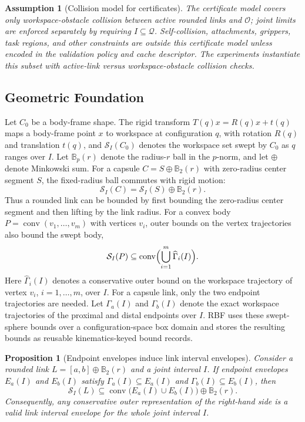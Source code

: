 \documentclass[journal]{IEEEtran}
\DeclareRobustCommand{\textsc}[1]{\textnormal{\MakeUppercase{#1}}}
\newtheorem{proposition}{Proposition}
\newtheorem{assumption}{Assumption}
\newcommand{\rbf}{\textsc{RBF}}
\newcommand{\Ball}{\ensuremath{\mathbb{B}}}
\newcommand{\Q}{\ensuremath{\mathcal{Q}}}
\begin{document}
\begin{samepage}
\begin{assumption}[Collision model for certificates]
\label{ass:collision_model}
The certificate model covers only workspace-obstacle collision between active
rounded links and $\mathcal{O}$; joint limits are enforced separately by
requiring $I\subseteq\Q$.
Self-collision, attachments, grippers, task regions, and other constraints are
outside this certificate model unless encoded in the validation policy and cache
descriptor. The experiments instantiate this subset with active-link
versus workspace-obstacle collision checks.
\end{assumption}
\end{samepage}

\subsection{Geometric Foundation}\label{sec:rewrite_geom}

Let \(C_0\) be a body-frame shape. The rigid transform
$T(q)x=R(q)x+t(q)$ maps a body-frame point \(x\) to workspace at configuration
$q$, with rotation $R(q)$ and translation $t(q)$, and
$\mathcal{S}_I(C_0)$ denotes the workspace set swept by \(C_0\) as $q$ ranges
over $I$. Let \(\Ball_p(r)\) denote the radius-\(r\) ball in the \(p\)-norm, and
let \(\oplus\) denote Minkowski sum. For a capsule $C=S\oplus \Ball_2(r)$ with
zero-radius center segment \(S\), the fixed-radius ball commutes with rigid
motion:
\[
\mathcal{S}_I(C)=\mathcal{S}_I(S)\oplus \Ball_2(r).
\]
Thus a rounded link can be bounded by first bounding the zero-radius center
segment and then lifting by the link radius. For a convex body
$P=\operatorname{conv}(v_1,\ldots,v_m)$ with vertices \(v_i\), outer bounds on
the vertex trajectories also bound the swept body,
\[
\mathcal{S}_I(P)\subseteq
\operatorname{conv}\Bigl(\bigcup_{i=1}^{m} \widehat{\Gamma}_i(I)\Bigr).
\]
Here \(\widehat{\Gamma}_i(I)\) denotes a conservative outer bound on the
workspace trajectory of vertex \(v_i\), \(i=1,\ldots,m\), over \(I\).
For a capsule link, only the two endpoint trajectories are needed. Let
\(\Gamma_a(I)\) and \(\Gamma_b(I)\) denote the exact workspace trajectories of
the proximal and distal endpoints over \(I\). \rbf{} uses these swept-sphere
bounds over a configuration-space box domain and stores the resulting bounds as
reusable kinematics-keyed bound records.

\begin{samepage}
\begin{proposition}[Endpoint envelopes induce link interval envelopes]
\label{prop:endpoint_to_link_envelope}
Consider a rounded link $L=[a,b]\oplus \Ball_2(r)$ and a joint interval $I$. If
endpoint envelopes $E_a(I)$ and $E_b(I)$ satisfy
$\Gamma_a(I)\subseteq E_a(I)$ and $\Gamma_b(I)\subseteq E_b(I)$, then
\[
\mathcal{S}_I(L)
\subseteq
\operatorname{conv}\bigl(E_a(I)\cup E_b(I)\bigr)\oplus \Ball_2(r).
\]
Consequently, any conservative outer representation of the right-hand side is a
valid link interval envelope for the whole joint interval $I$.
\end{proposition}
\end{samepage}
\end{document}
